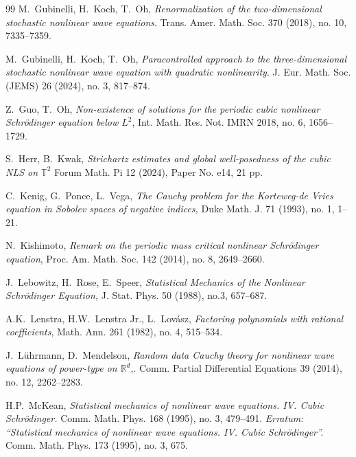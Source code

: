 \documentclass[%
11pt,  reqno]{amsart}
\newcommand{\1}{\hspace{0.2mm}\text{I}\hspace{0.2mm}}
\newcommand{\R}{\mathbb{R}}
\newcommand{\T}{\mathbb{T}}
\numberwithin{equation}{section}
\numberwithin{theorem}{section}
\begin{document}
\begin{thebibliography}{99}
M.~Gubinelli, H.~Koch, T.~Oh,
{\it Renormalization of the two-dimensional stochastic nonlinear wave equations}.
Trans. Amer. Math. Soc. 370 (2018), no. 10, 7335--7359.


M.~Gubinelli, H.~Koch, T.~Oh,
{\it Paracontrolled approach to the three-dimensional stochastic nonlinear wave equation with quadratic nonlinearity}.
J. Eur. Math. Soc. (JEMS) 26 (2024), no. 3, 817--874.




Z.~Guo, T.~Oh, 
{\it  Non-existence of solutions for the periodic cubic nonlinear Schr\"odinger equation below $L^2$}, Int. Math. Res. 
Not. IMRN 2018,  no. 6, 1656--1729. 


S.~Herr, B.~Kwak,
{\it Strichartz estimates and global well-posedness of the cubic NLS on $\T^2$}
Forum Math. Pi 12 (2024), Paper No. e14, 21 pp.






C.~Kenig, G.~Ponce, L.~Vega, 
{\it The Cauchy problem for the Korteweg-de Vries equation in Sobolev spaces of negative indices,}
Duke Math. J. 71 (1993), no. 1, 1--21. 


N.~Kishimoto, 
\emph{Remark on the periodic mass critical nonlinear Schr\"odinger equation}, 
Proc. Am. Math. Soc. 142 (2014), no. 8, 2649--2660.






J.~Lebowitz, H.~Rose, E.~Speer, {\it Statistical Mechanics of the Nonlinear Schr\"odinger Equation,}
J. Stat. Phys.  50 (1988), no.3, 657--687.



A.K.~Lenstra, H.W.~Lenstra Jr.,  L.~Lov\'asz, 
{\it Factoring polynomials with rational coefficients}, 
Math. Ann. 261 (1982), no. 4, 515--534. 



J.~L\"uhrmann, D.~Mendelson, 
{\it Random data Cauchy theory for nonlinear wave equations of power-type on $\R^d$},. Comm. Partial Differential Equations 39 (2014), no. 12, 2262--2283.

H.P.~McKean,
{\it Statistical mechanics of nonlinear wave equations. IV. Cubic Schr\"odinger.}
Comm. Math. Phys. 168 (1995), no. 3, 479--491.
{\it Erratum: ``Statistical mechanics of nonlinear wave equations. IV. Cubic Schr\"odinger''.}
Comm. Math. Phys. 173 (1995), no. 3, 675.




\end{thebibliography}
\end{document}
